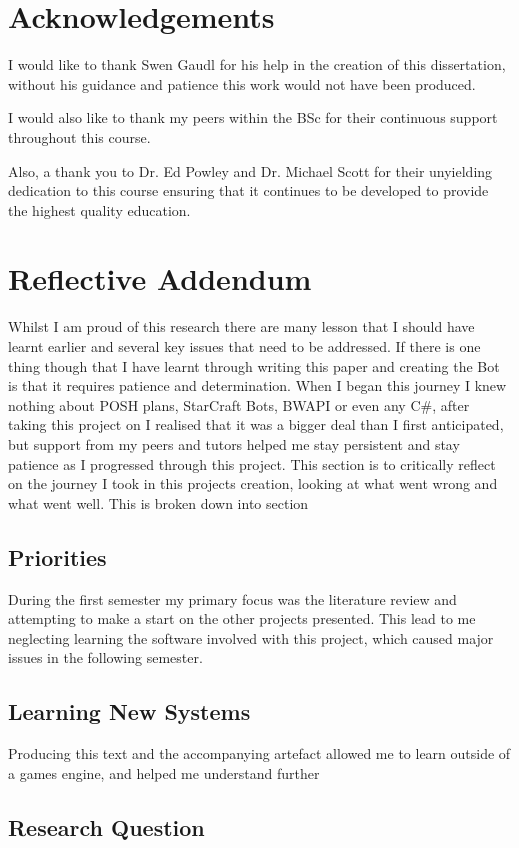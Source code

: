 \documentclass[journal]{IEEEtran}
\begin{document}
	\appendices
	\section*{Acknowledgements}
	I would like to thank Swen Gaudl for his help in the creation of this dissertation, without his guidance and patience this work would not have been produced.
	
	I would also like to thank my peers within the BSc for their continuous support throughout this course.
	
	Also, a thank you to Dr. Ed Powley and Dr. Michael Scott for their unyielding dedication to this course ensuring that it continues to be developed to provide the highest quality education.
	
	\section{Reflective Addendum}
	Whilst I am proud of this research there are many lesson that I should have learnt earlier and several key issues that need to be addressed. If there is one thing though that I have learnt through writing this paper and creating the Bot is that it requires patience and determination. When I began this journey I knew nothing about POSH plans, StarCraft Bots, BWAPI or even any C\#, after taking this project on I realised that it was a bigger deal than I first anticipated, but support from my peers and tutors helped me stay persistent and stay patience as I progressed through this project. This section is to critically reflect on the journey I took in this projects creation, looking at what went wrong and what went well. This is broken down into section 
	
	\subsection{Priorities}
	During the first semester my primary focus was the literature review and attempting to make a start on the other projects presented. This lead to me neglecting learning the software involved with this project, which caused major issues in the following semester. 
	\subsection{Learning New Systems}
	Producing this text and the accompanying artefact allowed me to learn outside of a games engine, and helped me understand further 
	\subsection{Research Question}
\end{document}
